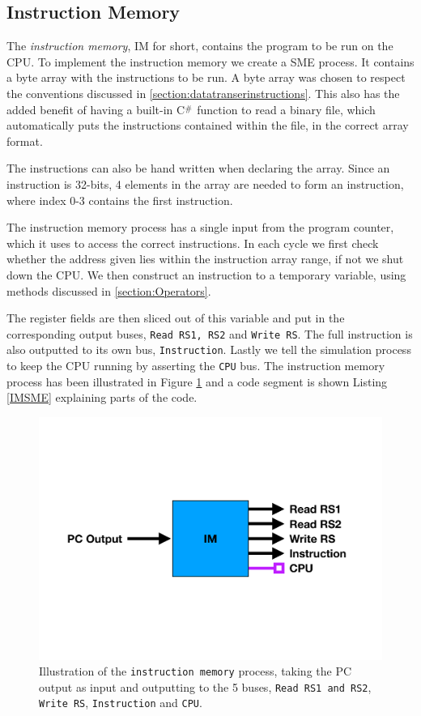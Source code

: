     \subsection{Instruction Memory}
        The \textit{instruction memory}, IM for short, contains the program to be run on the CPU. To implement the instruction memory we create a SME process. It contains a byte array with the instructions to be run. A byte array was chosen to respect the conventions discussed in \ref{section:datatranserinstructions}. This also has the added benefit of having a built-in C$\scalerel*{\#}{X}$ function to read a binary file, which automatically puts the instructions contained within the file, in the correct array format. 
        
        The instructions can also be hand written when declaring the array. Since an instruction is 32-bits, 4 elements in the array are needed to form an instruction, where index 0-3 contains the first instruction.
        
        The instruction memory process has a single input from the program counter, which it uses to access the correct instructions. In each cycle we first check whether the address given lies within the instruction array range, if not we shut down the CPU.
        We then construct an instruction to a temporary variable, using methods discussed in \ref{section:Operators}. 
        
        The register fields are then sliced out of this variable and put in the corresponding output buses, \texttt{Read RS1, RS2} and \texttt{Write RS}. The full instruction is also outputted to its own bus, \texttt{Instruction}. Lastly we tell the simulation process to keep the CPU running by asserting the \texttt{CPU} bus. The instruction memory process has been illustrated in Figure \ref{fig:IM} and a code segment is shown Listing \ref{IMSME} explaining parts of the code. 
     
        \begin{figure}[h!]
            \centering
            \includegraphics[scale=0.3]{pictures/IM.pdf}
            \caption{Illustration of the \texttt{instruction memory} process, taking the PC output as input and outputting to the 5 buses, \texttt{Read RS1 and RS2}, \texttt{Write RS}, \texttt{Instruction} and \texttt{CPU}.}
            \label{fig:IM}
        \end{figure}
    

